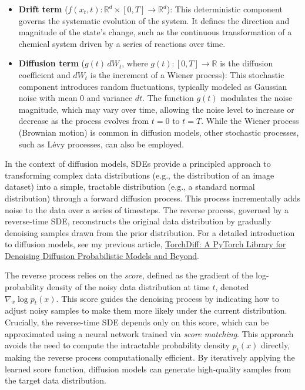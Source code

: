 \documentclass[12pt]{article}
\begin{document}
\begin{itemize}
    \item \textbf{Drift term} ($f(x_t, t): \mathbb{R}^d \times [0, T] \to \mathbb{R}^d$): This deterministic component governs the systematic evolution of the system. It defines the direction and magnitude of the state’s change, such as the continuous transformation of a chemical system driven by a series of reactions over time.
    
    \item \textbf{Diffusion term} ($g(t) \, dW_t$, where $g(t): [0, T] \to \mathbb{R}$ is the diffusion coefficient and $dW_t$ is the increment of a Wiener process): This stochastic component introduces random fluctuations, typically modeled as Gaussian noise with mean $0$ and variance $dt$. The function $g(t)$ modulates the noise magnitude, which may vary over time, allowing the noise level to increase or decrease as the process evolves from $t = 0$ to $t = T$. While the Wiener process (Brownian motion) is common in diffusion models, other stochastic processes, such as Lévy processes, can also be employed.
\end{itemize}

In the context of diffusion models, SDEs provide a principled approach to transforming complex data distributions (e.g., the distribution of an image dataset) into a simple, tractable distribution (e.g., a standard normal distribution) through a forward diffusion process. This process incrementally adds noise to the data over a series of timesteps. The reverse process, governed by a reverse-time SDE, reconstructs the original data distribution by gradually denoising samples drawn from the prior distribution. For a detailed introduction to diffusion models, see my previous article, \href{https://medium.com/@samaniloqman91/torchdiff-a-pytorch-library-for-denoising-diffusion-probabilistic-models-and-beyond-d15156e9e3b5}{TorchDiff: A PyTorch Library for Denoising Diffusion Probabilistic Models and Beyond}.

The reverse process relies on the \textit{score}, defined as the gradient of the log-probability density of the noisy data distribution at time $t$, denoted $\nabla_x \log p_t(x)$. This score guides the denoising process by indicating how to adjust noisy samples to make them more likely under the current distribution. Crucially, the reverse-time SDE depends only on this score, which can be approximated using a neural network trained via \textit{score matching}. This approach avoids the need to compute the intractable probability density $p_t(x)$ directly, making the reverse process computationally efficient. By iteratively applying the learned score function, diffusion models can generate high-quality samples from the target data distribution.
\end{document}
